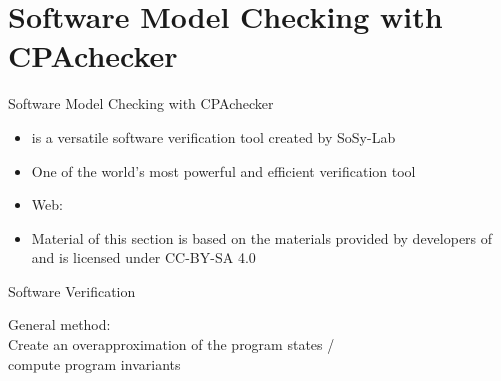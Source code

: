 
\section{Software Model Checking with CPAchecker}

\begin{frame}{Software Model Checking with CPAchecker}
\begin{itemize}
\itemsep1em
\item \cpachecker is a versatile software verification tool created by SoSy-Lab
\item One of the world's most powerful and efficient verification tool
\item Web: \cpacheckerurl
\item Material of this section is based on the materials provided by developers of \cpachecker and is licensed under CC-BY-SA 4.0 
\end{itemize}

\end{frame}
 

\begin{frame}{Software Verification}
  \small  
  \begin{minipage}{\textwidth}
    
  \end{minipage}
  
  \bigskip
  \begin{minipage}{0.45\textwidth}
    General method:\\
    Create an overapproximation of the program states / \\
    compute program invariants
  \end{minipage}
    \hspace{0.2cm}
  \begin{minipage}{0.5\textwidth}
    \resizebox{\textwidth}{!}{
      
    }
  \end{minipage}
\end{frame}


